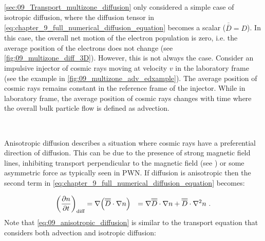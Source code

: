 \autoref{sec:09_Transport_multizone_diffusion} only considered a simple case of isotropic diffusion, where the diffusion tensor in \autoref{eq:chapter_9_full_numerical_diffusion_equation} becomes a scalar ($\overline{\overline{D}}=D$). In this case, the overall net motion of the electron population is zero, i.e. the average position of the electrons does not change (see \autoref{fig:09_multizone_diff_3D}). However, this is not always the case. Consider an impulsive injector of cosmic rays moving at velocity $v$ in the laboratory frame (see the example in \autoref{fig:09_multizone_adv_edxample}). The average position of cosmic rays remains constant in the reference frame of the injector. While in laboratory frame, the average position of cosmic rays changes with time where the overall bulk particle flow is defined as advection.
\par~\par
Anisotropic diffusion describes a situation where cosmic rays have a preferential direction of diffusion. This can be due to the presence of strong magnetic field lines, inhibiting transport perpendicular to the magnetic field (see \cite{2013ApJ...768...73M,2013MNRAS.429.1643N,2023arXiv230402684L}) or some asymmetric force as typically seen in PWN. If diffusion is anisotropic then the second term in \autoref{eq:chapter_9_full_numerical_diffusion_equation} becomes:

\begin{equation}
    \begin{aligned}
        \qty(\pdv{n}{t})_\text{diff}&=\nabla\qty(\overline{\overline{D}}\cdot\nabla n)
        &=\nabla\overline{\overline{D}}\cdot\nabla n+\overline{\overline{D}}\cdot\nabla^2 n\text{ .} 
    \end{aligned} \label{eq:09_anisotropic_diffusion}
\end{equation}
 \noindent Note that \autoref{eq:09_anisotropic_diffusion} is similar to the transport equation that considers both advection and isotropic diffusion:

